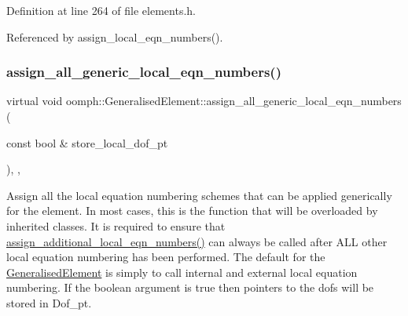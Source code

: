 Definition at line 264 of file elements.\+h.



Referenced by assign\+\_\+local\+\_\+eqn\+\_\+numbers().

\mbox{\label{classoomph_1_1GeneralisedElement_a35dfba78813087c1070c9fd1a69824e5}} 
\subsubsection{\texorpdfstring{assign\+\_\+all\+\_\+generic\+\_\+local\+\_\+eqn\+\_\+numbers()}{assign\_all\_generic\_local\_eqn\_numbers()}}
{\footnotesize\ttfamily virtual void oomph\+::\+Generalised\+Element\+::assign\+\_\+all\+\_\+generic\+\_\+local\+\_\+eqn\+\_\+numbers (\begin{DoxyParamCaption}\item[{const bool \&}]{store\+\_\+local\+\_\+dof\+\_\+pt }\end{DoxyParamCaption})\hspace{0.3cm}{\ttfamily [inline]}, {\ttfamily [protected]}, {\ttfamily [virtual]}}



Assign all the local equation numbering schemes that can be applied generically for the element. In most cases, this is the function that will be overloaded by inherited classes. It is required to ensure that \hyperlink{classoomph_1_1GeneralisedElement_a4cdd0d1eef33b43f652c8f0b9e43967b}{assign\+\_\+additional\+\_\+local\+\_\+eqn\+\_\+numbers()} can always be called after A\+LL other local equation numbering has been performed. The default for the \hyperlink{classoomph_1_1GeneralisedElement}{Generalised\+Element} is simply to call internal and external local equation numbering. If the boolean argument is true then pointers to the dofs will be stored in Dof\+\_\+pt. 



